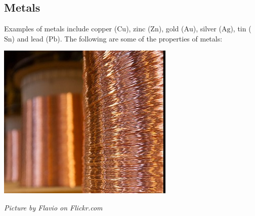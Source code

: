             \subsection*{Metals}
            \nopagebreak
\begin{minipage}{.5\textwidth}
        \label{m38708*id65726}Examples of metals include copper ($\mathrm{Cu}$), zinc ($\mathrm{Zn}$), gold ($\mathrm{Au}$), silver ($\mathrm{Ag}$), tin ($\mathrm{Sn}$) and lead ($\mathrm{Pb}$). The following are some of the properties of metals:\par 
\end{minipage}
\begin{minipage}{.5\textwidth}
\begin{center}
 \includegraphics[width=.4\textwidth]{photos/copperwireby-flavio.jpg}\par
\textit{Picture by Flavio on Flickr.com}
\end{center}
\end{minipage}

